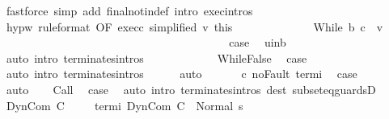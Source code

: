 \begin{isabellebody}
\ {\isacharparenleft}fastforce\ simp\ add{\isacharcolon}\ final{\isacharunderscore}notin{\isacharunderscore}def\ intro{\isacharcolon}\ exec{\isachardot}intros{\isacharparenright}\isanewline
\ \ \ \ \ \ \ \ \ \ \ \ \isamarkupfalse%
\ hyp{\isacharunderscore}w\ {\isacharbrackleft}rule{\isacharunderscore}format{\isacharcomma}\ OF\ exec{\isacharunderscore}c{\isacharprime}\ {\isacharbrackleft}simplified\ v{\isacharprime}{\isacharbrackright}\ this{\isacharbrackright}\isanewline
\ \ \ \ \ \ \ \ \ \ \ \ \isamarkupfalse%
\ {\isachardoublequoteopen}{\isasymGamma}{\isasymturnstile}While\ b\ c{\isacharprime}{\isacharprime}\ {\isasymdown}\ v{\isachardoublequoteclose}\ \isacommand{{\isachardot}}\isamarkupfalse%
\isanewline
\ \ \ \ \ \ \ \ \ \ \isamarkupfalse%
\isanewline
\ \ \ \ \ \ \ \ \isamarkupfalse%
\isanewline
\ \ \ \ \ \ \isacommand{{\isacharbraceright}}\isamarkupfalse%
\isanewline
\ \ \ \ \ \ \isamarkupfalse%
\isanewline
\ \ \ \ \ \ \isamarkupfalse%
\ {\isacharquery}case\ \isamarkupfalse%
\ u{\isacharunderscore}in{\isacharunderscore}b\ \isanewline
\ \ \ \ \ \ \ \ \isamarkupfalse%
\ {\isacharparenleft}auto\ intro{\isacharcolon}\ terminates{\isachardot}intros{\isacharparenright}\isanewline
\ \ \ \ \isamarkupfalse%
\isanewline
\ \ \ \ \ \ \isamarkupfalse%
\ WhileFalse\ \isamarkupfalse%
\ {\isacharquery}case\ \isamarkupfalse%
\ {\isacharparenleft}auto\ intro{\isacharcolon}\ terminates{\isachardot}intros{\isacharparenright}\isanewline
\ \ \ \ \isamarkupfalse%
\ auto\isanewline
\ \ \isacommand{{\isacharbraceright}}\isamarkupfalse%
\isanewline
\ \ \isamarkupfalse%
\ c\ noFault\ termi\ \isamarkupfalse%
\ {\isacharquery}case\isanewline
\ \ \ \ \isamarkupfalse%
\ auto\isanewline
{}\isamarkupfalse%
\isanewline
\ \ \isamarkupfalse%
\ Call\ \isamarkupfalse%
\ {\isacharquery}case\ \isamarkupfalse%
\ {\isacharparenleft}auto\ intro{\isacharcolon}\ terminates{\isachardot}intros\ dest{\isacharcolon}\ subseteq{\isacharunderscore}guardsD{\isacharparenright}\isanewline
{}\isamarkupfalse%
\isanewline
\ \ \isamarkupfalse%
\ {\isacharparenleft}DynCom\ C{\isacharprime}{\isacharparenright}\ \isanewline
\ \ \isamarkupfalse%
\ termi{\isacharcolon}\ {\isachardoublequoteopen}{\isasymGamma}{\isasymturnstile}DynCom\ C{\isacharprime}\ {\isasymdown}\ Normal\ s{\isachardoublequoteclose}\ \isamarkupfalse%

\end{isabellebody}
